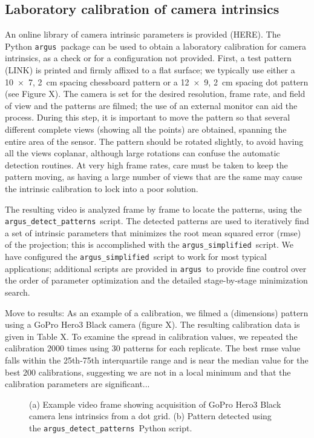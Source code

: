 \documentclass[fleqn,10pt]{wlpeerj}
\newcommand{\argus}{\texttt{argus}}
\newcommand{\detectpatterns}{\texttt{argus\_detect\_patterns}}
\newcommand{\simplified}{\texttt{argus\_simplified}}
\begin{document}
\subsection*{Laboratory calibration of camera intrinsics}
An online library of camera intrinsic parameters is provided (HERE).  The Python \argus\ package can be used to obtain a laboratory calibration for camera intrinsics, as a check or for a configuration not provided. First, a test pattern (LINK) is printed and firmly affixed to a flat surface; we typically use either a \num{10 x 7}, \SI{2}{\centi\meter} spacing chessboard pattern or a \num{12 x 9}, \SI{2}{\centi\meter} spacing dot pattern (see Figure X).  The camera is set for the desired resolution, frame rate, and field of view and the patterns are filmed; the use of an external monitor can aid the process.  During this step, it is important to move the pattern so that several different complete views (showing all the points) are obtained, spanning the entire area of the sensor. The pattern should be rotated slightly, to avoid having all the views coplanar, although large rotations can confuse the automatic detection routines.  At very high frame rates, care must be taken to keep the pattern moving, as having a large number of views that are the same may cause the intrinsic calibration to lock into a poor solution.  

The resulting video is analyzed frame by frame to locate the patterns, using the \detectpatterns\ script.  The detected patterns are used to iteratively find a set of intrinsic parameters that minimizes the root mean squared error (rmse) of the projection; this is accomplished with the \simplified\ script.  We have configured the \simplified\ script to work for most typical applications; additional scripts are provided in \argus\ to provide fine control over the order of parameter optimization and the detailed stage-by-stage minimization search.

Move to results: As an example of a calibration, we filmed a (dimensions) pattern using a GoPro Hero3 Black camera (figure X).  The resulting calibration data is given in Table X. To examine the spread in calibration values, we repeated the calibration 2000 times using 30 patterns for each replicate. The best rmse value falls within the 25th-75th interquartile range and is near the median value for the best 200 calibrations, suggesting we are not in a local minimum and that the calibration parameters are significant...   

\begin{figure}
\caption{(a) Example video frame showing acquisition of GoPro Hero3 Black camera lens intrinsics from a dot grid.  (b) Pattern detected using the \detectpatterns\ Python script.}
\label{fig:labcal1}
\end{figure}
\end{document}
